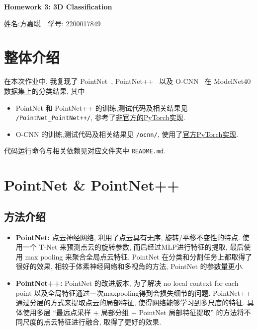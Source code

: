 \documentclass[11pt]{article}
\newcommand\1{\mathds{1}}
\begin{document}
\pagestyle{fancy}
\chead{}
\fancyfoot[R]{} 
\fancyfoot[C]{\thepage\ /\ \pageref{LastPage} \\ \textcolor{lightgray}{最后编译时间: \today}}


\begin{center}
    {\LARGE \bf Homework 3: 3D Classification} 

    {\kaishu 姓名:方嘉聪\ \  学号: 2200017849}            %
\end{center}

\section{整体介绍}
在本次作业中, 我复现了 PointNet~\cite{qi2016pointnet}, PointNet++~\cite{qi2017pointnetplusplus} 以及 O-CNN~\cite{Wang-2017-ocnn} 在 ModelNet40 数据集上的分类结果, 
其中 
\begin{itemize}
    \item PointNet 和 PointNet++ 的训练,测试代码及相关结果见 \texttt{/PointNet\_PointNet++/}, 参考了\href{https://github.com/yanx27/Pointnet_Pointnet2_pytorch}{非官方的PyTorch实现}.
    \item O-CNN 的训练,测试代码及相关结果见 \texttt{/ocnn/}, 使用了\href{https://github.com/octree-nn/ocnn-pytorch}{官方PyTorch实现}.
\end{itemize}
代码运行命令与相关依赖见对应文件夹中 \texttt{README.md}.

\section{PointNet \& PointNet++}
\subsection{方法介绍}
\begin{itemize}
    \item \textbf{PointNet:} 点云神经网络, 利用了点云具有无序, 旋转/平移不变性的特点. 
    使用一个 T-Net 来预测点云的旋转参数, 而后经过MLP进行特征的提取, 最后使用 max pooling 来聚合全局点云特征. 
    PointNet 在分类和分割任务上都取得了很好的效果, 相较于体素神经网络和多视角的方法, PointNet 的参数量更小.
    \item \textbf{PointNet++:} PointNet 的改进版本, 为了解决 no local context for each point 以及全局特征通过一次maxpooling得到会损失细节的问题. PointNet++ 通过分层的方式来提取点云的局部特征, 使得网络能够学习到多尺度的特征. 具体使用多层 ``最远点采样 + 局部分组 + PointNet 局部特征提取'' 的方法将不同尺度的点云特征进行融合, 取得了更好的效果.
\end{itemize}
\end{document}
